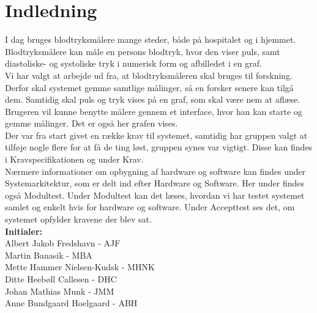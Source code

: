 \chapter{Indledning}
I  dag bruges blodtryksmålere mange steder, både på hospitalet og i hjemmet. Blodtryksmålere kan måle en persons blodtryk, hvor den viser puls, samt diastoliske- og systoliske tryk i numerisk form og afbilledet i en graf.\\ 
Vi har valgt at arbejde ud fra, at blodtryksmåleren skal bruges til forskning. Derfor skal systemet gemme samtlige målinger, så en forsker senere kan tilgå dem. Samtidig skal puls og tryk vises på en graf, som skal være nem at aflæse. Brugeren vil kunne benytte målere gennem et interface, hvor han kan starte og gemme målinger. Det er også her grafen vises. \\
Der var fra start givet en række krav til systemet, samtidig har gruppen valgt at tilføje nogle flere for at få de ting løst, gruppen synes var vigtigt. Disse kan findes i Kravspecifikationen og under Krav.\\
Nærmere informationer om opbygning af hardware og software kan findes under Systemarkitektur, som er delt ind efter Hardware og Software. Her under findes også Modultest. 
Under Modultest kan det læses, hvordan vi har testet systemet samlet og enkelt hvis for hardware og software. Under Accepttest ses det, om systemet opfylder kravene der blev sat.\\ 


\textbf{Initialer: } \\
Albert Jakob Fredshavn - AJF \\
Martin Banasik - MBA \\
Mette Hammer Nielsen-Kudsk - MHNK \\
Ditte Heebøll Callesen - DHC \\
Johan Mathias Munk - JMM \\
Anne Bundgaard Hoelgaard - ABH \\


